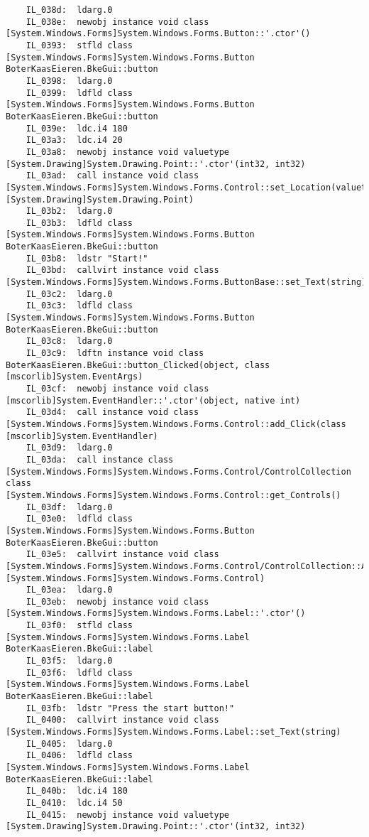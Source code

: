 \begin{lstlisting}
	IL_038d:  ldarg.0 
	IL_038e:  newobj instance void class [System.Windows.Forms]System.Windows.Forms.Button::'.ctor'()
	IL_0393:  stfld class [System.Windows.Forms]System.Windows.Forms.Button BoterKaasEieren.BkeGui::button
	IL_0398:  ldarg.0 
	IL_0399:  ldfld class [System.Windows.Forms]System.Windows.Forms.Button BoterKaasEieren.BkeGui::button
	IL_039e:  ldc.i4 180
	IL_03a3:  ldc.i4 20
	IL_03a8:  newobj instance void valuetype [System.Drawing]System.Drawing.Point::'.ctor'(int32, int32)
	IL_03ad:  call instance void class [System.Windows.Forms]System.Windows.Forms.Control::set_Location(valuetype [System.Drawing]System.Drawing.Point)
	IL_03b2:  ldarg.0 
	IL_03b3:  ldfld class [System.Windows.Forms]System.Windows.Forms.Button BoterKaasEieren.BkeGui::button
	IL_03b8:  ldstr "Start!"
	IL_03bd:  callvirt instance void class [System.Windows.Forms]System.Windows.Forms.ButtonBase::set_Text(string)
	IL_03c2:  ldarg.0 
	IL_03c3:  ldfld class [System.Windows.Forms]System.Windows.Forms.Button BoterKaasEieren.BkeGui::button
	IL_03c8:  ldarg.0 
	IL_03c9:  ldftn instance void class BoterKaasEieren.BkeGui::button_Clicked(object, class [mscorlib]System.EventArgs)
	IL_03cf:  newobj instance void class [mscorlib]System.EventHandler::'.ctor'(object, native int)
	IL_03d4:  call instance void class [System.Windows.Forms]System.Windows.Forms.Control::add_Click(class [mscorlib]System.EventHandler)
	IL_03d9:  ldarg.0 
	IL_03da:  call instance class [System.Windows.Forms]System.Windows.Forms.Control/ControlCollection class [System.Windows.Forms]System.Windows.Forms.Control::get_Controls()
	IL_03df:  ldarg.0 
	IL_03e0:  ldfld class [System.Windows.Forms]System.Windows.Forms.Button BoterKaasEieren.BkeGui::button
	IL_03e5:  callvirt instance void class [System.Windows.Forms]System.Windows.Forms.Control/ControlCollection::Add(class [System.Windows.Forms]System.Windows.Forms.Control)
	IL_03ea:  ldarg.0 
	IL_03eb:  newobj instance void class [System.Windows.Forms]System.Windows.Forms.Label::'.ctor'()
	IL_03f0:  stfld class [System.Windows.Forms]System.Windows.Forms.Label BoterKaasEieren.BkeGui::label
	IL_03f5:  ldarg.0 
	IL_03f6:  ldfld class [System.Windows.Forms]System.Windows.Forms.Label BoterKaasEieren.BkeGui::label
	IL_03fb:  ldstr "Press the start button!"
	IL_0400:  callvirt instance void class [System.Windows.Forms]System.Windows.Forms.Label::set_Text(string)
	IL_0405:  ldarg.0 
	IL_0406:  ldfld class [System.Windows.Forms]System.Windows.Forms.Label BoterKaasEieren.BkeGui::label
	IL_040b:  ldc.i4 180
	IL_0410:  ldc.i4 50
	IL_0415:  newobj instance void valuetype [System.Drawing]System.Drawing.Point::'.ctor'(int32, int32)

\end{lstlisting}
